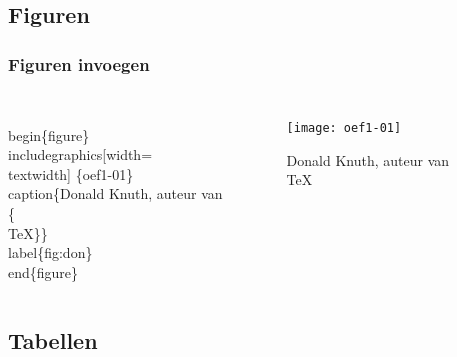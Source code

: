 \documentclass[aspectratio=169]{beamer}
\begin{document}
\subsection{Figuren}

\begin{frame}[fragile]
  \frametitle{Figuren invoegen}
  
  \begin{columns}[c]
    \begin{semiverbatim}
      \alert<1>{\\begin\{figure\}}
      \alert<2>{\\includegraphics[width=\\textwidth]
        \{oef1-01\}}
      \alert<3>{\\caption\{Donald Knuth, auteur van
        \{\\TeX\}\}}
      \alert<4>{\\label\{fig:don\}}
      \alert<1>{\\end\{figure\}}
    \end{semiverbatim}
    
    \begin{figure}
      \texttt{[image: oef1-01]}
      \caption{Donald Knuth, auteur van {\TeX}}
      \label{fig:don}
    \end{figure}
    
  \end{columns}
  
\end{frame}

\subsection{Tabellen}
\end{document}
